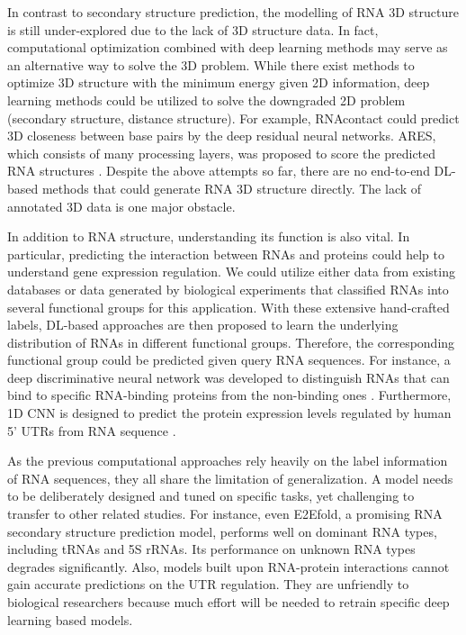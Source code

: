 In contrast to secondary structure prediction, the modelling of RNA 3D structure is still under-explored due to the lack of 3D structure data.
In fact, computational optimization combined with deep learning methods may serve as an alternative way to solve the 3D problem. While there exist methods to optimize 3D structure with the minimum energy \citep{xiong2021pairing} given 2D information, deep learning methods could be utilized to solve the downgraded 2D problem (secondary structure, distance structure). 
For example, RNAcontact \cite{sun2021rna} could predict 3D closeness between base pairs by the deep residual neural networks. ARES, which consists of many processing layers, was proposed to score the predicted RNA structures \citep{townshend2021geometric}.
Despite the above attempts so far, there are no end-to-end DL-based methods that could generate RNA 3D structure directly. The lack of annotated 3D data is one major obstacle. 

In addition to RNA structure, understanding its function is also vital. In particular, predicting the interaction between RNAs and proteins \cite{lam2019deep,sun2021predicting} could help to understand gene expression regulation. We could utilize either data from existing databases or data generated by biological experiments that classified RNAs into several functional groups for this application. With these extensive hand-crafted labels, DL-based approaches are then proposed to learn the underlying distribution of RNAs in different functional groups. Therefore, the corresponding functional group could be predicted given query RNA sequences. For instance, a deep discriminative neural network was developed to distinguish RNAs that can bind to specific RNA-binding proteins from the non-binding ones \cite{sun2021predicting}.
Furthermore, 1D CNN is designed to predict the protein expression levels regulated by human 5' UTRs from RNA sequence \cite{sample2019human}.


As the previous computational approaches rely heavily on the label information of RNA sequences, they all share the limitation of generalization. A model needs to be deliberately designed and tuned on specific tasks, yet challenging to transfer to other related studies. For instance, even E2Efold, a promising RNA secondary structure prediction model, performs well on dominant RNA types, including tRNAs and 5S rRNAs. Its performance on unknown RNA types degrades significantly. Also, models built upon RNA-protein interactions cannot gain accurate predictions on the UTR regulation. They are unfriendly to biological researchers because much effort will be needed to retrain specific deep learning based models. 

